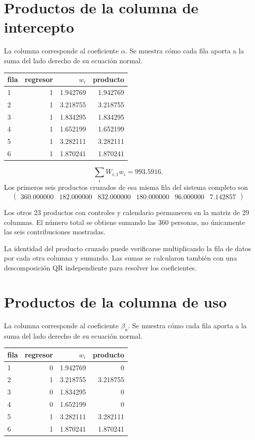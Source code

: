 \documentclass[11pt,a4paper]{article}
\begin{document}
\section{Productos de la columna de intercepto}
La columna corresponde al coeficiente $\alpha$. Se muestra cómo cada fila aporta a la suma del lado derecho de su ecuación normal.
\begin{center}\small
\begin{tabular}{lrrr}
\toprule
fila & regresor & $w_i$ & producto\\\midrule
1 & 1 & 1.942769 & 1.942769\\
2 & 1 & 3.218755 & 3.218755\\
3 & 1 & 1.834295 & 1.834295\\
4 & 1 & 1.652199 & 1.652199\\
5 & 1 & 3.282111 & 3.282111\\
6 & 1 & 1.870241 & 1.870241\\
\bottomrule
\end{tabular}\end{center}

\[
\sum_iW_{i,1}w_i=993.5916.
\]
Los primeros seis productos cruzados de esa misma fila del sistema completo son
\[
\begin{pmatrix}360.000000 & 182.000000 & 832.000000 & 180.000000 & 96.000000 & 7.142857\end{pmatrix}
\]

Los otros 23 productos con controles y calendario permanecen en la matriz de 29 columnas. El número total se obtiene sumando las 360 personas, no únicamente las seis contribuciones mostradas.

La identidad del producto cruzado puede verificarse multiplicando la fila de datos por cada otra columna y sumando. Las sumas se calcularon también con una descomposición QR independiente para resolver los coeficientes.

\clearpage
\section{Productos de la columna de uso}
La columna corresponde al coeficiente $\beta_u$. Se muestra cómo cada fila aporta a la suma del lado derecho de su ecuación normal.
\begin{center}\small
\begin{tabular}{lrrr}
\toprule
fila & regresor & $w_i$ & producto\\\midrule
1 & 0 & 1.942769 & 0\\
2 & 1 & 3.218755 & 3.218755\\
3 & 0 & 1.834295 & 0\\
4 & 0 & 1.652199 & 0\\
5 & 1 & 3.282111 & 3.282111\\
6 & 1 & 1.870241 & 1.870241\\
\bottomrule
\end{tabular}\end{center}
\end{document}
